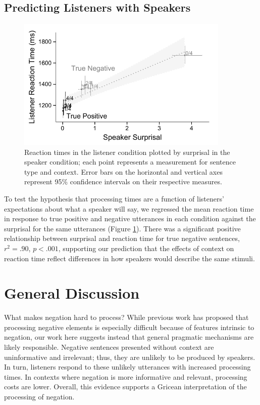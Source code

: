 \documentclass[man, noapacite]{apa2}
\begin{document}
\subsection{Predicting Listeners with Speakers}

\begin{figure}[t]
\begin{center} 
\includegraphics[width=4in]{figures/production_rts_mod.pdf}
\caption{\label{fig:scatter} Reaction times in the listener condition plotted by surprisal in the speaker condition; each point represents a measurement for sentence type and context. Error bars on the horizontal and vertical axes represent 95\% confidence intervals on their respective measures.}
\end{center} 
\end{figure}

To test the hypothesis that processing times are a function of listeners' expectations about what a speaker will say, we regressed the mean reaction time in response to true positive and negative utterances in each condition against the surprisal for the same utterances (Figure \ref{fig:scatter}).  There was a significant positive relationship between surprisal and reaction time for true negative sentences, $r^2=.90$, $p<.001$, supporting our prediction that the effects of context on reaction time reflect differences in how speakers would describe the same stimuli.  

\section{General Discussion}

What makes negation hard to process? While previous work has proposed that processing negative elements is especially difficult because of features intrinsic to negation, our work here suggests instead that general pragmatic mechanisms are likely responsible. Negative sentences presented without context are uninformative and irrelevant; thus, they are unlikely to be produced by speakers. In turn, listeners respond to these unlikely utterances with increased processing times. In contexts where negation is more informative and relevant, processing costs are lower. Overall, this evidence supports a Gricean interpretation of the processing of negation.
\end{document}
